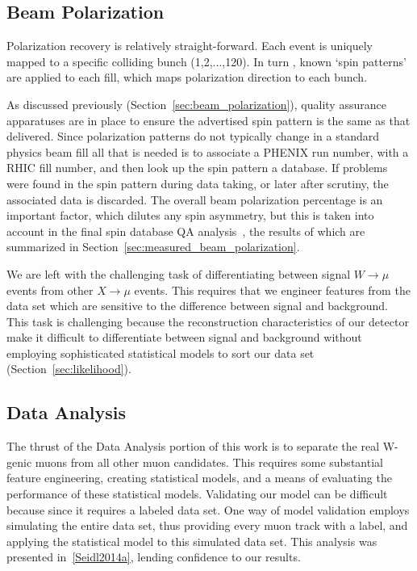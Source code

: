 \subsection{Beam Polarization}

Polarization recovery is relatively straight-forward. Each event is uniquely
mapped to a specific colliding bunch (1,2,...,120). In turn , known `spin
patterns' are applied to each fill, which maps polarization direction to each
bunch. 

As discussed previously (Section~\ref{sec:beam_polarization}), quality assurance
apparatuses are in place to ensure the advertised spin pattern is the same as
that delivered. Since polarization patterns do not typically change in a
standard physics beam fill all that is needed is to associate a PHENIX run
number, with a RHIC fill number, and then look up the spin pattern a database.
If problems were found in the spin pattern during data taking, or later after
scrutiny, the associated data is discarded. The overall beam polarization
percentage is an important factor, which dilutes any spin asymmetry, but this is
taken into account in the final spin database QA analysis~\cite{Kim2014}, the
results of which are summarized in Section~\ref{sec:measured_beam_polarization}.

We are left with the challenging task of differentiating between signal
$W\rightarrow\mu$ events from other $X\rightarrow\mu$ events. This requires that
we engineer features from the data set which are sensitive to the difference
between signal and background. This task is challenging because the
reconstruction characteristics of our detector make it difficult to
differentiate between signal and background without employing sophisticated
statistical models to sort our data set (Section~\ref{sec:likelihood}).


\subsection{Data Analysis}

The thrust of the Data Analysis portion of this work is to separate the real
W-genic muons from all other muon candidates. This requires some substantial
feature engineering, creating statistical models, and a means of evaluating the
performance of these statistical models. Validating our model can be difficult
because since it requires a labeled data set. One way of model validation
employs simulating the entire data set, thus providing every muon track with a
label, and applying the statistical model to this simulated data set. This
analysis was presented in~\ref{Seidl2014a}, lending confidence to our results.

